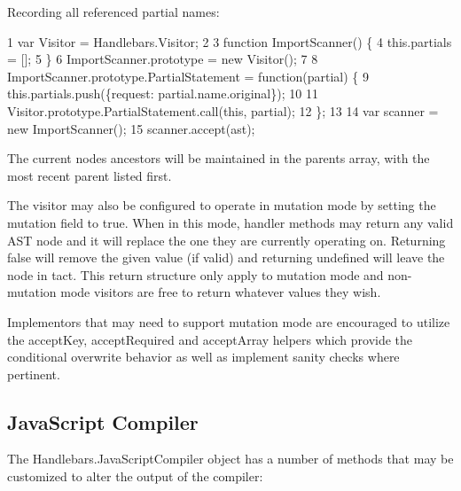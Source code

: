 Recording all referenced partial names\+:


\begin{DoxyCode}
1 var Visitor = Handlebars.Visitor;
2 
3 function ImportScanner() \{
4   this.partials = [];
5 \}
6 ImportScanner.prototype = new Visitor();
7 
8 ImportScanner.prototype.PartialStatement = function(partial) \{
9   this.partials.push(\{request: partial.name.original\});
10 
11   Visitor.prototype.PartialStatement.call(this, partial);
12 \};
13 
14 var scanner = new ImportScanner();
15 scanner.accept(ast);
\end{DoxyCode}


The current node\textquotesingle{}s ancestors will be maintained in the {\ttfamily parents} array, with the most recent parent listed first.

The visitor may also be configured to operate in mutation mode by setting the {\ttfamily mutation} field to true. When in this mode, handler methods may return any valid A\+S\+T node and it will replace the one they are currently operating on. Returning {\ttfamily false} will remove the given value (if valid) and returning {\ttfamily undefined} will leave the node in tact. This return structure only apply to mutation mode and non-\/mutation mode visitors are free to return whatever values they wish.

Implementors that may need to support mutation mode are encouraged to utilize the {\ttfamily accept\+Key}, {\ttfamily accept\+Required} and {\ttfamily accept\+Array} helpers which provide the conditional overwrite behavior as well as implement sanity checks where pertinent.

\subsection*{Java\+Script Compiler}

The {\ttfamily Handlebars.\+Java\+Script\+Compiler} object has a number of methods that may be customized to alter the output of the compiler\+:


